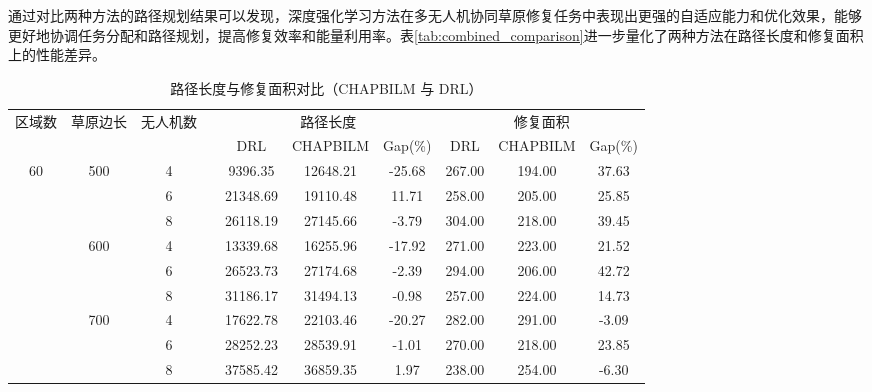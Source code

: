 \documentclass[AutoFakeBold]{LZUThesis}
\begin{document}
通过对比两种方法的路径规划结果可以发现，深度强化学习方法在多无人机协同草原修复任务中表现出更强的自适应能力和优化效果，能够更好地协调任务分配和路径规划，提高修复效率和能量利用率。表\ref{tab:combined_comparison}进一步量化了两种方法在路径长度和修复面积上的性能差异。
\begin{table}[H]
	\centering
	\caption{路径长度与修复面积对比（CHAPBILM 与 DRL）}
	\small
	\setlength{\tabcolsep}{3.5pt}
	\begin{tabular}{cccc ccc ccc}
		\toprule
		区域数                 & 草原边长                 & 无人机数 &  & \multicolumn{3}{c}{路径长度} & \multicolumn{3}{c}{修复面积}                                       \\
		\cmidrule(lr){5-7} \cmidrule(lr){8-10}
		                    &                      &      &  & DRL                      & CHAPBILM                       & Gap(\%) & DRL    & CHAPBILM     & Gap(\%) \\
		\midrule
		\multirow{9}{*}{60} & \multirow{3}{*}{500} & 4    &  & 9396.35                  & 12648.21                 & -25.68  & 267.00 & 194.00 & 37.63   \\
		                    &                      & 6    &  & 21348.69                 & 19110.48                 & 11.71   & 258.00 & 205.00 & 25.85   \\
		                    &                      & 8    &  & 26118.19                 & 27145.66                 & -3.79   & 304.00 & 218.00 & 39.45   \\
		\cmidrule(lr){2-10}
		                    & \multirow{3}{*}{600} & 4    &  & 13339.68                 & 16255.96                 & -17.92  & 271.00 & 223.00 & 21.52   \\
		                    &                      & 6    &  & 26523.73                 & 27174.68                 & -2.39   & 294.00 & 206.00 & 42.72   \\
		                    &                      & 8    &  & 31186.17                 & 31494.13                 & -0.98   & 257.00 & 224.00 & 14.73   \\
		\cmidrule(lr){2-10}
		                    & \multirow{3}{*}{700} & 4    &  & 17622.78                 & 22103.46                 & -20.27  & 282.00 & 291.00 & -3.09   \\
		                    &                      & 6    &  & 28252.23                 & 28539.91                 & -1.01   & 270.00 & 218.00 & 23.85   \\
		                    &                      & 8    &  & 37585.42                 & 36859.35                 & 1.97    & 238.00 & 254.00 & -6.30   \\

\end{tabular}
\end{table}
\end{document}
